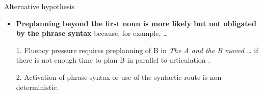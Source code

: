 

\begin{frame}{Alternative hypothesis}

\begin{itemize}
	\item \textbf{Preplanning beyond the first noun is more likely but not obligated by the phrase syntax} because, for example, \dots 
	\item[1.] Fluency pressure requires preplanning of B in \textit{The A and the B moved \dots} if there is not enough time to plan B in parallel to articulation \parencite{all07,griffin2003reversed}.
	\item[2.] Activation of phrase syntax or use of the syntactic route is non-deterministic.
\end{itemize}

\end{frame}


